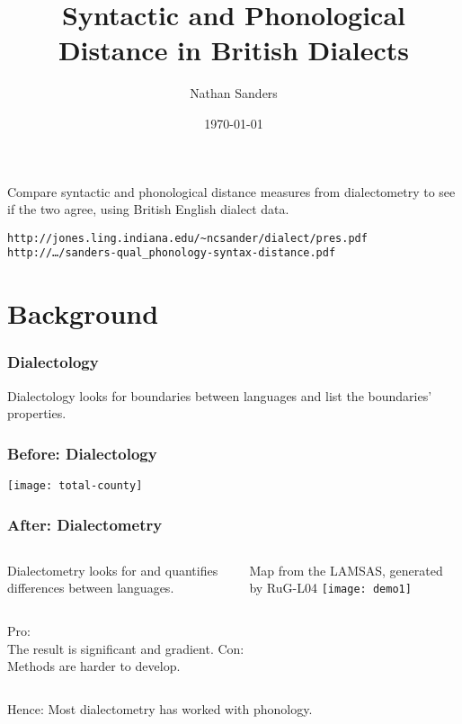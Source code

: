 \documentclass{beamer}
\title{Syntactic and Phonological Distance in British Dialects}
\author{Nathan Sanders}
\date{\today}
\begin{document}
\frame{\titlepage}

\section[Outline]{}
\frame{\tableofcontents}
\begin{frame}
  Compare syntactic and phonological distance measures from
  dialectometry to see if the two agree, using British English dialect data.
  
  \vspace{2cm}

  {\tt http://jones.ling.indiana.edu/\~{}ncsander/dialect/pres.pdf}\\
  {\tt http://\ldots{}/sanders-qual\_phonology-syntax-distance.pdf}
\end{frame}
\section{Background}
\begin{frame}
  \frametitle{Dialectology}
  \begin{definition}
    Dialectology looks for boundaries between languages and list the
    boundaries' properties.
  \end{definition}
\end{frame}
\begin{frame}
  \frametitle{Before: Dialectology}
  \texttt{[image: total-county]}
\end{frame}
\begin{frame}
  \frametitle{After: Dialectometry}
\begin{columns}

  \begin{definition}
    Dialectometry looks for and quantifies differences between languages.
  \end{definition}
  Map from the LAMSAS, generated by RuG-L04
  \texttt{[image: demo1]}
\end{columns}
\end{frame}
\begin{frame}
\begin{columns}
Pro:\\
  The result is significant and gradient.
Con: \\
  Methods are harder to develop.
\end{columns}
\vspace{2cm}
Hence: Most dialectometry has worked with phonology.
\end{frame}
\end{document}
